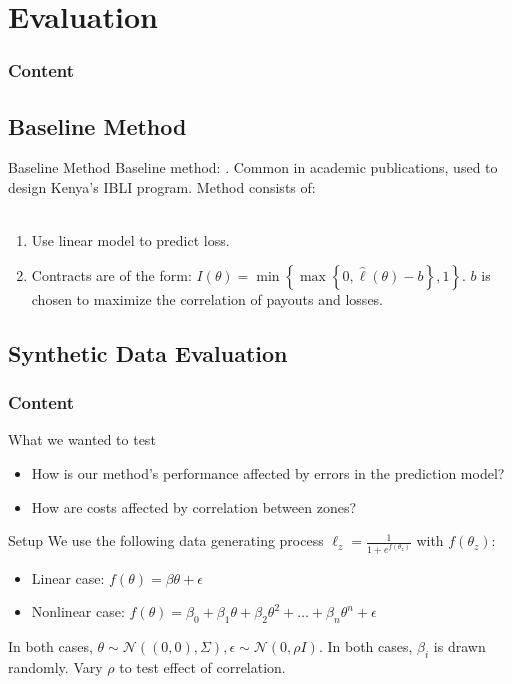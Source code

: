 \documentclass{beamer}
\begin{document}
\section{Evaluation}
\begin{frame}
    \frametitle{Content}
\end{frame}
\subsection{Baseline Method}\label{baseline}
\begin{frame}{Baseline Method}
    Baseline method: \cite{chantarat2013designing}. Common in academic publications, used to design Kenya's IBLI program. Method consists of: 
    \\~~\\
    \begin{enumerate}
        \setlength\itemsep{1em}
        \item Use linear model to predict loss.
        \item Contracts are of the form: $I(\theta) = \min \left \{\max \left \{0,\hat{\ell}(\theta) - b \right \}, 1 \right \}$. $b$ is chosen to maximize the correlation of payouts and losses. 
    \end{enumerate}
\end{frame}

\subsection{Synthetic Data Evaluation}
\begin{frame}
    \frametitle{Content}
\end{frame}

\begin{frame}{What we wanted to test}
    \begin{itemize}
        \setlength\itemsep{2em}
        \item How is our method's performance affected by errors in the prediction model?
        \item How are costs affected by correlation between zones?
    \end{itemize}
\end{frame}

\begin{frame}{Setup}
    We use the following data generating process $\ell_z = \frac{1}{1+e^{f(\theta_z)}}$ with $f(\theta_z)$:  
      \begin{itemize}
        \item Linear case: $f(\theta) = \beta \theta + \epsilon$
        \item Nonlinear case: $f(\theta) = \beta_0 + \beta_1 \theta + \beta_2 \theta^2 + \ldots + \beta_n \theta^n+ \epsilon$
      \end{itemize}

      In both cases, $\theta \sim \mathcal{N}((0,0),\Sigma), \epsilon \sim \mathcal{N}(0,\rho I)$. In both cases, $\beta_i$ is drawn randomly. Vary $\rho$ to test effect of correlation.
\end{frame}
\end{document}
